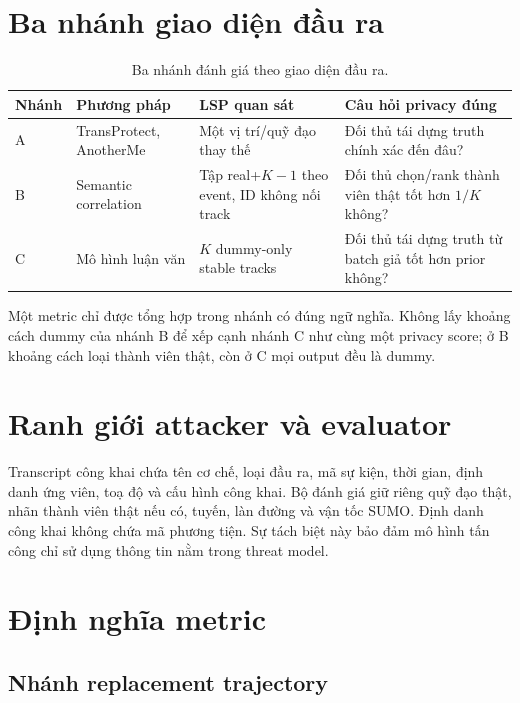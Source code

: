 \documentclass[12pt,a4paper,oneside]{report}
\begin{document}
\section{Ba nhánh giao diện đầu ra}

\begin{table}[htbp]
\centering
\small
\caption{Ba nhánh đánh giá theo giao diện đầu ra.}
\label{tab:benchmark-tracks}
\begin{tabularx}{\textwidth}{P{2.0cm}P{3.2cm}P{3.1cm}Y}
\toprule
\textbf{Nhánh} & \textbf{Phương pháp} & \textbf{LSP quan sát} & \textbf{Câu hỏi privacy đúng} \\
\midrule
A & TransProtect, AnotherMe & Một vị trí/quỹ đạo thay thế & Đối thủ tái dựng truth chính xác đến đâu? \\
B & Semantic correlation & Tập real+$K-1$ theo event, ID không nối track & Đối thủ chọn/rank thành viên thật tốt hơn $1/K$ không? \\
C & Mô hình luận văn & $K$ dummy-only stable tracks & Đối thủ tái dựng truth từ batch giả tốt hơn prior không? \\
\bottomrule
\end{tabularx}
\end{table}

Một metric chỉ được tổng hợp trong nhánh có đúng ngữ nghĩa. Không lấy khoảng cách dummy của nhánh B để xếp cạnh nhánh C như cùng một privacy score; ở B khoảng cách loại thành viên thật, còn ở C mọi output đều là dummy.

\section{Ranh giới attacker và evaluator}

Transcript công khai chứa tên cơ chế, loại đầu ra, mã sự kiện, thời gian, định danh ứng viên, toạ độ và cấu hình công khai. Bộ đánh giá giữ riêng quỹ đạo thật, nhãn thành viên thật nếu có, tuyến, làn đường và vận tốc SUMO. Định danh công khai không chứa mã phương tiện. Sự tách biệt này bảo đảm mô hình tấn công chỉ sử dụng thông tin nằm trong threat model.

\section{Định nghĩa metric}

\subsection{Nhánh replacement trajectory}
\end{document}
